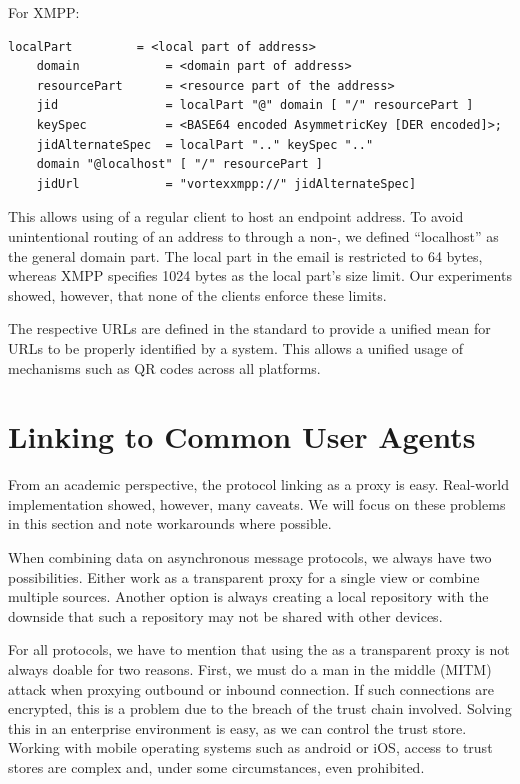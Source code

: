 For XMPP:
\begin{lstlisting}[language=EBNF]
	localPart         = <local part of address>
	domain            = <domain part of address>
	resourcePart      = <resource part of the address>
	jid               = localPart "@" domain [ "/" resourcePart ]
	keySpec           = <BASE64 encoded AsymmetricKey [DER encoded]>;
	jidAlternateSpec  = localPart ".." keySpec ".." 
	domain "@localhost" [ "/" resourcePart ]
	jidUrl            = "vortexxmpp://" jidAlternateSpec]
\end{lstlisting}

This allows using of a regular client to host an \VortexMessage{} endpoint address. To avoid unintentional routing of an address to through a non-\VortexNode{}, we defined ``localhost'' as the general domain part. The local part in the email is restricted to 64 bytes, whereas XMPP specifies 1024 bytes as the local part's size limit. Our experiments showed, however, that none of the clients enforce these limits.

The respective URLs are defined in the standard to provide a unified mean for URLs to be properly identified by a system. This allows a unified usage of mechanisms such as QR codes across all platforms.

\section{Linking to Common User Agents}
From an academic perspective, the protocol linking as a proxy is easy. Real-world implementation showed, however, many caveats. We will focus on these problems in this section and note workarounds where possible.

When combining data on asynchronous message protocols, we always have two possibilities. Either work as a transparent proxy for a single view or combine multiple sources. Another option is always creating a local repository with the downside that such a repository may not be shared with other devices.

For all protocols, we have to mention that using the \VortexNode{} as a transparent proxy is not always doable for two reasons. First, we must do a man in the middle (MITM) attack when proxying outbound or inbound connection. If such connections are encrypted, this is a problem due to the breach of the trust chain involved. Solving this in an enterprise environment is easy, as we can control the trust store. Working with mobile operating systems such as android or iOS, access to trust stores are complex and, under some circumstances, even prohibited.

